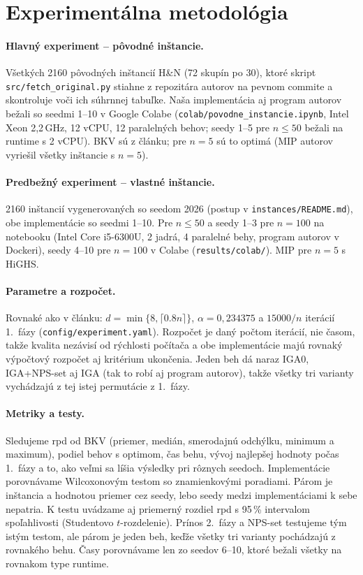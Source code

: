 \documentclass[11pt,a4paper]{article}
\begin{document}
\section{Experimentálna metodológia}

\paragraph{Hlavný experiment -- pôvodné inštancie.} Všetkých 2160 pôvodných inštancií H\&N
(72 skupín po 30), ktoré skript \texttt{src/fetch\_original.py} stiahne z repozitára autorov na
pevnom commite a skontroluje voči ich súhrnnej tabuľke. Naša implementácia aj program autorov
bežali so seedmi 1--10 v Google Colabe (\texttt{colab/povodne\_instancie.ipynb}, Intel Xeon
2,2\,GHz, 12 vCPU, 12 paralelných behov; seedy 1--5 pre $n\le 50$ bežali na runtime
s 2 vCPU). BKV sú z článku; pre $n=5$ sú to optimá (MIP autorov vyriešil všetky inštancie
s $n=5$).

\paragraph{Predbežný experiment -- vlastné inštancie.} 2160 inštancií vygenerovaných so
seedom 2026 (postup v \texttt{instances/\allowbreak README.md}), obe implementácie so seedmi 1--10.
Pre $n\le 50$ a seedy 1--3 pre $n=100$ na notebooku (Intel Core i5-6300U, 2 jadrá, 4 paralelné
behy, program autorov v Dockeri), seedy 4--10 pre $n=100$ v Colabe (\texttt{results/colab/}).
MIP pre $n=5$ s HiGHS.

\paragraph{Parametre a rozpočet.} Rovnaké ako v článku: $d=\min\{8,\lceil 0.8n\rceil\}$,
$\alpha=0{,}234375$ a $15000/n$ iterácií 1.~fázy (\texttt{config/\allowbreak experiment.yaml}).
Rozpočet je daný počtom iterácií, nie časom, takže kvalita nezávisí od rýchlosti počítača
a obe implementácie majú rovnaký výpočtový rozpočet aj kritérium ukončenia. Jeden beh dá naraz
IGA0, IGA+NPS-set aj IGA (tak to robí aj program autorov), takže všetky tri varianty vychádzajú
z tej istej permutácie z 1.~fázy.

\paragraph{Metriky a testy.} Sledujeme rpd od BKV (priemer, medián, smerodajnú odchýlku, minimum
a maximum), podiel behov s optimom, čas behu, vývoj najlepšej hodnoty počas 1.~fázy a to, ako
veľmi sa líšia výsledky pri rôznych seedoch. Implementácie porovnávame Wilcoxonovým testom so
znamienkovými poradiami. Párom je inštancia a hodnotou priemer cez seedy, lebo seedy medzi
implementáciami k sebe nepatria. K testu uvádzame aj priemerný rozdiel rpd s 95\,\%
intervalom spoľahlivosti (Studentovo $t$-rozdelenie). Prínos 2.~fázy a NPS-set testujeme tým
istým testom, ale párom je jeden beh, keďže všetky tri varianty pochádzajú z rovnakého behu.
Časy porovnávame len zo seedov 6--10, ktoré bežali všetky na rovnakom type runtime.
\end{document}
